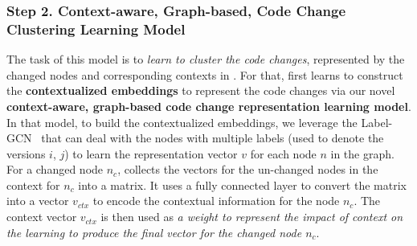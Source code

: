 
\subsubsection{{\bf Step 2. Context-aware, Graph-based, Code Change Clustering Learning Model}} The task of this model is to {\em learn to cluster the code changes}, represented by
the changed nodes and corresponding contexts in {\mvpdg}. For
that, {\tool} first learns to construct the {\bf contextualized
  embeddings} to represent the code changes via our novel
{\bf context-aware, graph-based code change representation learning
  model}. In that model, to build the contextualized embeddings, we
leverage
the Label-GCN~\cite{label-gcn} that can deal with the nodes with
multiple labels (used to denote the versions $i$, $j$) to
learn the representation vector $v$ for each node $n$ in the
graph. For a changed node $n_c$, {\tool} collects the vectors for the
un-changed nodes in the context for $n_c$ into a matrix. It uses a
fully connected layer to convert the matrix into a vector $v_{ctx}$ to
encode the contextual information for the node $n_c$. The
context vector $v_{ctx}$ is then used as {\em a weight to represent
  the impact of context on the learning to produce the final vector
  for the changed node $n_c$}.

